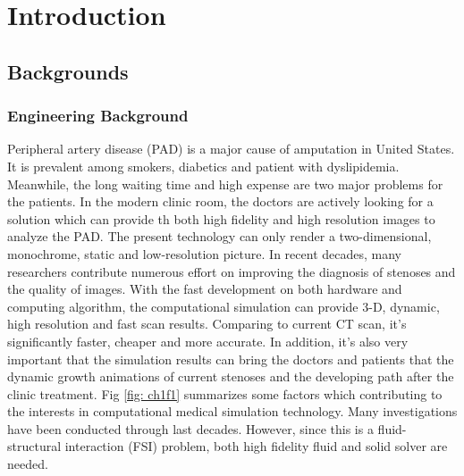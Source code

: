 \chapter{Introduction}
\label{ch:chap1}


\section{Backgrounds}

\subsection{Engineering Background}

Peripheral artery disease (PAD) is a major cause of amputation in United States. It is prevalent among smokers, diabetics and patient with dyslipidemia. Meanwhile, the long waiting time and high expense are two major problems for the patients. In the modern clinic room, the doctors are actively looking for a solution which can provide th both high fidelity and high resolution images to analyze the PAD. The  present technology can only render a two-dimensional,  monochrome, static and low-resolution picture. In recent decades, many researchers contribute numerous effort on improving the diagnosis of stenoses and the quality of images\cite{clark1976fluid, nesbitt2009shear, wardlaw2006non, stergiopulos1992computer, long2001numerical}. With the fast development on both hardware and computing algorithm, the computational simulation can provide 3-D, dynamic, high resolution and fast scan results. Comparing to current CT scan, it's significantly faster, cheaper and more accurate. In addition, it's also very important that the simulation results can bring the doctors and patients that the dynamic growth animations of current stenoses and the developing path after the clinic treatment. Fig \ref{fig: ch1f1} summarizes some factors which contributing to the interests in computational medical simulation technology\cite{barry2005features}. Many investigations have been conducted through last decades\cite{feng2012viscous, bertram2010evaluation, nadeem2010simulation, ogulu2005simulation}. However, since this is a fluid-structural interaction (FSI) problem, both high fidelity fluid and solid solver are needed. 

